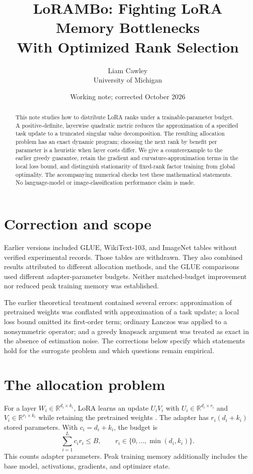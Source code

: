 \documentclass[11pt]{article}
\title{LoRAMBo: Fighting LoRA Memory Bottlenecks\\With Optimized Rank Selection}
\author{Liam Cawley\\University of Michigan}
\date{Working note; corrected October 2026}
\begin{document}
\maketitle

\begin{abstract}
This note studies how to distribute LoRA ranks under a trainable-parameter
budget. A positive-definite, layerwise quadratic metric reduces the approximation
of a specified task update to a truncated singular value decomposition. The
resulting allocation problem has an exact dynamic program; choosing the next
rank by benefit per parameter is a heuristic when layer costs differ. We give a
counterexample to the earlier greedy guarantee, retain the gradient and
curvature-approximation terms in the local loss bound, and distinguish
stationarity of fixed-rank factor training from global optimality.
The accompanying numerical checks test these mathematical statements.
No language-model or image-classification performance claim is made.
\end{abstract}

\section{Correction and scope}

Earlier versions included GLUE, WikiText-103, and ImageNet tables without
verified experimental records. Those tables are withdrawn. They also combined
results attributed to different allocation methods, and the GLUE comparisons
used different adapter-parameter budgets. Neither matched-budget improvement
nor reduced peak training memory was established.

The earlier theoretical treatment contained several errors: approximation of
pretrained weights was conflated with approximation of a task update; a local
loss bound omitted its first-order term; ordinary Lanczos was applied to a
nonsymmetric operator; and a greedy knapsack argument was treated as exact in
the absence of estimation noise. The corrections below specify which statements
hold for the surrogate problem and which questions remain empirical.

\section{The allocation problem}

For a layer $W_i\in\mathbb{R}^{d_i\times k_i}$, LoRA learns an update
$U_iV_i$ with $U_i\in\mathbb{R}^{d_i\times r_i}$ and
$V_i\in\mathbb{R}^{r_i\times k_i}$ while retaining the pretrained weights
\cite{hu2022lora}. The adapter has $r_i(d_i+k_i)$ stored parameters.
With $c_i=d_i+k_i$, the budget is
\[
  \sum_{i=1}^L c_i r_i\leq B,\qquad
  r_i\in\{0,\ldots,\min(d_i,k_i)\}.
\]
This counts adapter parameters. Peak training memory additionally includes the
base model, activations, gradients, and optimizer state.
\end{document}
